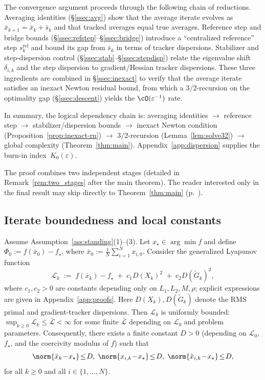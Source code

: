 \documentclass[review,onefignum,onetabnum]{siamart171218}
\begin{document}
The convergence argument proceeds through the following chain of
reductions.
Averaging identities (\S\ref{ssec:avg}) show that the average iterate evolves as
$\bar x_{k+1}=\bar x_k+\bar s_k$ and that tracked averages
equal true averages.
Reference step and bridge bounds
(\S\ref{ssec:refstep}--\S\ref{ssec:bridge}) introduce a
``centralized reference'' step $s_k^{\mathrm{ref}}$ and bound
its gap from $\bar s_k$ in terms of tracker dispersions.
Stabilizer and step-dispersion control
(\S\ref{ssec:stab}--\S\ref{ssec:stepdisp}) relate the
eigenvalue shift $\delta_{i,k}$ and the step dispersion to
gradient/Hessian tracker dispersions.
These three ingredients are combined in \S\ref{ssec:inexact}
to verify that the
average iterate satisfies an inexact Newton residual bound,
from which a $3/2$-recursion on the
optimality gap (\S\ref{ssec:descent}) yields the $\cO(\varepsilon^{-1})$ rate.

In summary, the logical dependency chain is:
averaging identities $\to$ reference step $\to$ stabilizer/dispersion bounds
$\to$ inexact Newton condition (Proposition~\ref{prop:inexact-rn})
$\to$ $3/2$-recursion (Lemma~\ref{lem:solve32})
$\to$ global complexity (Theorem~\ref{thm:main}).
Appendix~\ref{app:dispersion} supplies the burn-in index~$K_0(\varepsilon)$.

The proof combines two independent stages (detailed in
Remark~\ref{rem:two_stages} after the main theorem).
The reader interested only in the final result may skip directly to
Theorem~\ref{thm:main} (p.~\pageref{thm:main}).

\subsection{Iterate boundedness and local constants}\label{ssec:iterate_bound}

	\begin{lemma}\label{lem:lyap_bound}
		Assume Assumption~\ref{ass:standing}(1)--(3).
		Let $x_\star\in\arg\min f$ and define
		$\Phi_0:=f(\bar x_0)-f_\star$, where $\bar x_0:=\frac1N\sum_{i=1}^N x_{i,0}$.
		Consider the generalized Lyapunov function
		\[
		\mathcal L_k \;:=\; f(\bar x_k)-f_\star \;+\; c_1 D(X_k)^2 \;+\; c_2 D(\tilde G_k)^2,
		\]
		where $c_1,c_2>0$ are constants depending only on $L_1,L_2,M,\rho$;
		explicit expressions are given in Appendix~\ref{app:proofs}. Here
		$D(X_k), D(\tilde G_k)$ denote the RMS primal and gradient-tracker dispersions.
		Then $\mathcal L_k$ is uniformly bounded: $\sup_{k\ge 0}\mathcal L_k \le \bar{\mathcal L} < \infty$ for some finite $\bar{\mathcal L}$ depending on $\mathcal L_0$ and problem parameters.
		Consequently, there exists a finite constant $D>0$
		(depending on $\mathcal L_0$, $f_\star$, and the coercivity modulus of $f$)
		such that
		\begin{equation}\label{eq:bounded_levelset}
			\norm{\bar x_k\!-\!x_\star}\!\le\! D,\;
			\norm{x_{i,k}\!-\!x_\star}\!\le\! D,\;
			\norm{\tilde x_{i,k}\!-\!x_\star}\!\le\! D,
		\end{equation}
		for all $k\ge 0$ and all $i\in\{1,\dots,N\}$.
	\end{lemma}
\end{document}
